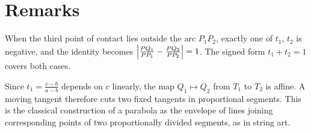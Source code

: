 \documentclass[11pt,a4paper]{article}
\begin{document}
\section{Remarks}

\begin{remark}
  When the third point of contact lies outside the arc $P_1P_2$, exactly one of
  $t_1$, $t_2$ is negative, and the identity becomes
  $\abs*{\frac{PQ_1}{PP_1} - \frac{PQ_2}{PP_2}} = 1$. The signed form $t_1 + t_2 = 1$
  covers both cases.
\end{remark}

\begin{remark}
  Since $t_1 = \frac{c - b}{a - b}$ depends on $c$ linearly, the map $Q_1 \mapsto Q_2$
  from $T_1$ to $T_2$ is affine. A moving tangent therefore cuts two fixed tangents
  in proportional segments. This is the classical construction of a parabola as the
  envelope of lines joining corresponding points of two proportionally divided
  segments, as in string art.
\end{remark}
\end{document}
